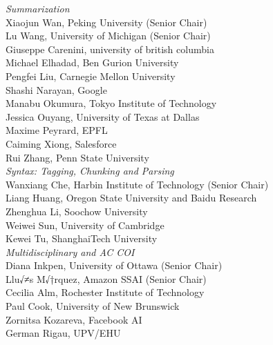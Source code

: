 \emph{Summarization} \\
\hspace*{0.2in} Xiaojun Wan, Peking University (Senior Chair)\\
\hspace*{0.2in} Lu Wang, University of Michigan (Senior Chair)\\
\hspace*{0.2in} Giuseppe Carenini, university of british columbia\\
\hspace*{0.2in} Michael Elhadad, Ben Gurion University\\
\hspace*{0.2in} Pengfei Liu, Carnegie Mellon University\\
\hspace*{0.2in} Shashi Narayan, Google\\
\hspace*{0.2in} Manabu Okumura, Tokyo Institute of Technology\\
\hspace*{0.2in} Jessica Ouyang, University of Texas at Dallas\\
\hspace*{0.2in} Maxime Peyrard, EPFL\\
\hspace*{0.2in} Caiming Xiong, Salesforce\\
\hspace*{0.2in} Rui Zhang, Penn State University\\

\emph{Syntax: Tagging, Chunking and Parsing} \\
\hspace*{0.2in} Wanxiang Che, Harbin Institute of Technology (Senior Chair)\\
\hspace*{0.2in} Liang Huang, Oregon State University and Baidu Research\\
\hspace*{0.2in} Zhenghua Li, Soochow University\\
\hspace*{0.2in} Weiwei Sun, University of Cambridge\\
\hspace*{0.2in} Kewei Tu, ShanghaiTech University\\

\emph{Multidisciplinary and AC COI} \\
\hspace*{0.2in} Diana Inkpen, University of Ottawa (Senior Chair)\\
\hspace*{0.2in} Llu√≠s M√†rquez, Amazon SSAI (Senior Chair)\\
\hspace*{0.2in} Cecilia Alm, Rochester Institute of Technology\\
\hspace*{0.2in} Paul Cook, University of New Brunswick\\
\hspace*{0.2in} Zornitsa Kozareva, Facebook AI\\
\hspace*{0.2in} German Rigau, UPV/EHU\\

